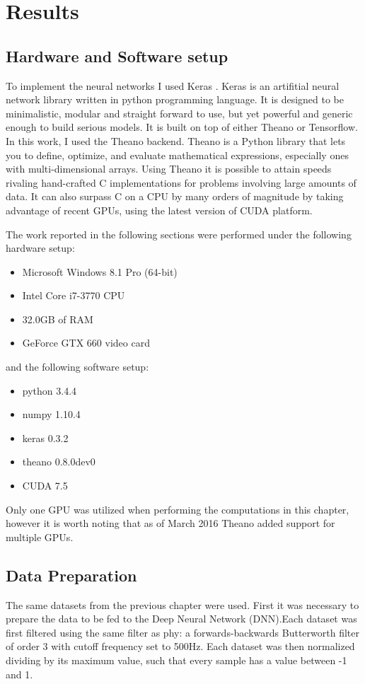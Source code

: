 \section{Results}
\label{sec:DL-results}

\subsection{Hardware and Software setup}
\label{subsec:hardware-software}
To implement the neural networks I used Keras \cite{chollet2015keras}. Keras is an artifitial neural network library written in python programming language. It is designed to be minimalistic, modular and straight forward to use, but yet powerful and generic enough to build serious models. It is built on top of either Theano or Tensorflow. In this work, I used the Theano backend. Theano is a Python library that lets you to define, optimize, and evaluate mathematical expressions, especially ones with multi-dimensional arrays. Using Theano it is possible to attain speeds rivaling hand-crafted C implementations for problems involving large amounts of data. It can also surpass C on a CPU by many orders of magnitude by taking advantage of recent GPUs, using the latest version of CUDA platform. \cite{theano2010} \cite{theano2012}

The work reported in the following sections were performed under the following hardware setup:
\begin{itemize}
\item Microsoft Windows 8.1 Pro (64-bit)
\item Intel Core i7-3770 CPU
\item 32.0GB of RAM
\item GeForce GTX 660 video card
\end{itemize}

\noindent 
and the following software setup:
\begin{itemize}
\item python 3.4.4
\item numpy 1.10.4
\item keras 0.3.2
\item theano 0.8.0dev0
\item CUDA 7.5
\end{itemize}

Only one GPU was utilized when performing the computations in this chapter, however it is worth noting that as of March 2016 Theano added support for multiple GPUs.

\subsection{Data Preparation}
\label{subsec:data-preparation}
The same datasets from the previous chapter were used. First it was necessary to prepare the data to be fed to the Deep Neural Network (DNN).Each dataset was first filtered using the same filter as phy: a forwards-backwards Butterworth filter of order 3 with cutoff frequency set to 500Hz. Each dataset was then normalized dividing by its maximum value, such that every sample has a value between -1 and 1.


